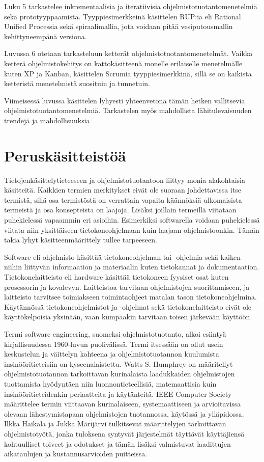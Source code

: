\documentclass[finnish,12pt]{tktltiki2}
\theoremstyle{definition}
\theoremstyle{remark}
\begin{document}
Luku 5 tarkastelee inkrementaalisia ja iteratiivisia ohjelmistotuotantomenetelmiä sekä prototyyppaamista. Tyyppiesimerkkeinä käsittelen RUP:ia eli Rational Unified Processia sekä spiraalimallia, jota voidaan pitää vesiputousmallin kehittyneempänä versiona.

Luvussa 6 otetaan tarkasteluun ketterät ohjelmistotuotantomenetelmät. Vaikka ketterä ohjelmistokehitys on kattokäsitteenä monelle erilaiselle menetelmälle kuten XP ja Kanban, käsittelen Scrumia tyyppiesimerkkinä, sillä se on kaikista ketteristä menetelmistä suosituin ja tunnetuin.

Viimeisessä luvussa käsittelen lyhyesti yhteenvetona tämän hetken vallitsevia ohjelmistotuotantomenetelmiä. Tarkastelen myös mahdollista lähitulevaisuuden trendejä ja mahdollisuuksia

\section{Peruskäsitteistöä}
Tietojenkäsittelytieteeseen ja ohjelmistotuotantoon liittyy monia alakohtaisia käsitteitä. Kaikkien termien merkitykset eivät ole suoraan johdettavissa itse termistä, sillä osa termistöstä on verrattain vapaita käännöksiä ulkomaisista termeistä ja osa konsepteista on laajoja. Lisäksi joillain termeillä viitataan puhekielessä  vapaammin eri asioihin. Esimerkiksi softwarella voidaan puhekielessä viitata niin yksittäiseen tietokoneohjelmaan kuin laajaan ohjelmistoonkin. Tämän takia lyhyt käsitteenmäärittely tullee tarpeeseen.

Software eli ohjelmisto käsittää tietokoneohjelman tai -ohjelmia sekä kaiken niihin liittyvän informaation ja materiaalin kuten tietokannat ja dokumentaation. \newline Tietokonelaitteisto eli hardware käsittää tietokoneen fyysiset osat kuten prosessorin ja kovalevyn. Laitteistoa tarvitaan ohjelmistojen suorittamiseen, ja laitteisto tarvitsee toimiakseen toimintaohjeet matalan tason tietokoneohjelmina. Käytännössä tietokoneohjelmistot ja -ohjelmat sekä tietokonelaitteisto eivät ole käyttökelpoisia yksinään, vaan kumpaakin tarvitaan toisen järkevään käyttöön.

Termi software engineering, suomeksi ohjelmistotuotanto, alkoi esiintyä kirjallisuudessa 1960-luvun puolivälissä. Termi itsessään on ollut usein keskustelun ja väittelyn kohteena ja ohjelmistotuotannon kuulumista insinööritieteisiin on kyseenalaistettu. \cite{DBLP:reference/se/Grier10,haikala2003ohjelmistotuotanto,mahoney04}
Watts S. Humphrey on määritellyt ohjelmistotuotannon tarkoittavan kurinalaista laadukkaiden ohjelmistojen tuottamista hyödyntäen niin luonnontieteellisiä, matemaattisia kuin insinööritieteidenkin periaatteita ja käytänteitä\cite{Humphrey:1988:SEP:75110.75122}. IEEE Computer Society määrittelee termin viittaavan kurinalaiseen, systemaattiseen ja arvioitavissa olevaan lähestymistapaan ohjelmistojen tuotannossa, käytössä ja ylläpidossa\cite{swebok}. Ilkka Haikala ja Jukka Märijärvi tulkitsevat määrittelyjen tarkoittavan ohjelmistotyötä, jonka tuloksena syntyvät järjestelmät täyttävät käyttäjiensä kohtuulliset toiveet ja odotukset ja tämän lisäksi valmistuvat laadittujen aikataulujen ja kustannusarvioiden puitteissa\cite{haikala2003ohjelmistotuotanto}.
\end{document}
